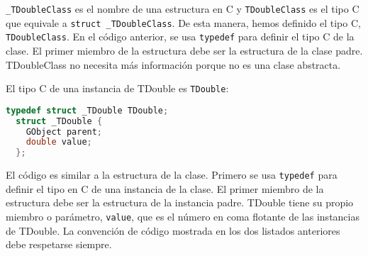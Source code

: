 \texttt{\_TDoubleClass} es el nombre de una estructura en C y \texttt{TDoubleClass} es el tipo C que equivale
a \texttt{struct \_TDoubleClass}. De esta manera, hemos definido el tipo C, \texttt{TDoubleClass}.
En el código anterior, se usa \texttt{typedef} para definir el tipo C de la clase. El primer miembro de la estructura
debe ser la estructura de la clase padre. \textsf{TDoubleClass} no necesita más información porque no es una
clase abstracta.

\newpage
El tipo C de una instancia de \textsf{TDouble} es \texttt{TDouble}:
\begin{lstlisting}[language=C]
  typedef struct _TDouble TDouble;
  struct _TDouble {
    GObject parent;
    double value;
  };
\end{lstlisting}
  
El código es similar a la estructura de la clase. Primero se usa \texttt{typedef} para definir el tipo en C de una
instancia de la clase. El primer miembro de la estructura debe ser la estructura de la instancia padre.
\textsf{TDouble} tiene su propio miembro o parámetro, \texttt{value}, que es el número en coma flotante
de las instancias de \textsf{TDouble}.
La convención de código mostrada en los dos listados anteriores debe respetarse siempre.






